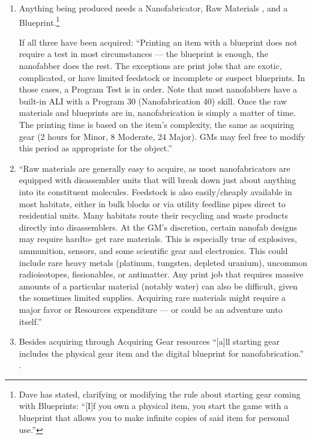 \begin{enumerate}
    \item Anything being produced needs a \gls{Nanofabricator}, Raw Materials \citep[p. 314]{ep2e_1.1_2019}, and a \gls{Blueprint}.\footnote{Dave has stated, clarifying or modifying the rule about starting gear coming with \glspl{Blueprint}: “[I]f you own a physical item, you start the game with a blueprint that allows you to make infinite copies of said item for personal use.”}

    If all three have been acquired: “Printing an item with a blueprint does not require a test in most circumstances — the blueprint is enough, the nanofabber does the rest. The exceptions are print jobs that are exotic, complicated, or have limited feedstock or incomplete or suspect blueprints. In those cases, a Program Test is in order. Note that most nanofabbers have a built-in ALI with a Program 30 (Nanofabrication 40) skill. Once the raw materials and blueprints are in, nanofabrication is simply a matter of time. The printing time is based on the item’s complexity, the same as acquiring gear (2 hours for Minor, 8 Moderate, 24 Major). GMs may feel free to modify this period as appropriate for the object.” \citep[pg. 314]{ep2e_1.1_2019}

    \item “Raw materials are generally easy to acquire, as most nanofabricators are equipped with disassembler units that will break down just about anything into its constituent molecules. Feedstock is also easily/cheaply available in most habitats, either in bulk blocks or via utility feedline pipes direct to residential units. Many habitats route their recycling and waste products directly into disassemblers. At the GM’s discretion, certain nanofab designs may require hardto- get rare materials. This is especially true of explosives, ammunition, sensors, and some scientific gear and electronics. This could include rare heavy metals (platinum, tungsten, depleted uranium), uncommon radioisotopes, fissionables, or antimatter. Any print job that requires massive amounts of a particular material (notably water) can also be difficult, given the sometimes limited supplies. Acquiring rare materials might require a major favor or Resources expenditure — or could be an adventure unto itself.” \citep[pg. 314]{ep2e_1.1_2019}
    \item Besides acquiring  through Acquiring Gear resources “[a]ll starting gear includes the physical gear item and the digital blueprint for nanofabrication.” \citep[pg. 68]{ep2e_1.1_2019}.


\end{enumerate}
